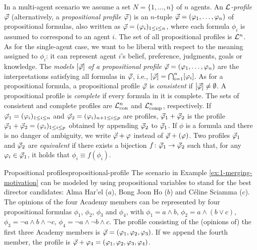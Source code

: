 In a multi-agent scenario we assume a set $N=\{1,\dots,n\}$ of $n$ agents.
An \emph{$\L$-profile $\P$} (alternatively, a \emph{propositional profile $\P$}) 
is an $n$-tuple $\P=(\phi_1,\dots,\phi_n)$ of propositional formulas,
also written as $\P=(\phi_i)_{1\le i \le n}$,
where each formula $\phi_i$ is assumed to correspond to an agent $i$.
The set of all propositional profiles is $\L^n$.
As for the single-agent case, we want to be liberal with respect 
to the meaning assigned to $\phi_i$:
it can represent agent $i$'s belief, preference, judgments, goals or knowledge.
The \emph{models $[\P]$ of a propositional profile $\P=(\phi_1,\dots,\phi_n)$} 
are the interpretations satisfying all 
formulas in $\P$, i.e., $[\P]=\bigcap_{i=1}^n[\phi_i]$.
As for a propositional formula, a propositional profile $\P$ is \emph{consistent} 
if $[\P]\neq\emptyset$.
A propositional profile is \emph{complete} 
if every formula in it is complete.
The sets of consistent and complete profiles are $\L^n_\cn$ and $\L^n_\comp$, respectively.
If $\P_1=(\phi_{i})_{1\le i \le n}$ and $\P_2=(\phi_{i})_{n+1\le i \le p}$ are profiles, 
$\append{\P_1}{\P_2}$ is the profile $\P_1+\P_2=(\phi_i)_{1\le i\le p}$ 
obtained by appending $\P_2$ to $\P_1$. 
If $\phi$ is a formula and there is no danger of ambiguity, 
we write $\append{\P}{\phi}$ instead of $\append{\P}{(\phi)}$.
Two profiles $\P_1$ and $\P_2$ are \emph{equivalent} 
if there exists a bijection $f\colon\P_1\rightarrow\P_2$ such that,
for any $\phi_i\in\P_1$, it holds that $\phi_i\equiv f(\phi_i)$.

\begin{xmpl}{Propositional profiles}{propositional-profile}
	The scenario in Example \ref{ex:1-merging-motivation} can be modeled 
	by using propositional variables to stand for the best director candidates:
	Alma Har'el ($a$),
	Bong Joon Ho ($b$)
	and 
	C\'eline Sciamma ($c$).
	The opinions of the four Academy members can be represented 
	by four propositional formulas $\phi_1$, $\phi_2$, $\phi_3$ and $\phi_4$,
	with 
	$\phi_1 = a\land b$,
	$\phi_2 = a\land (b\lor c)$,
	$\phi_3 = \lnot a\land b\land \lnot c$,
	$\phi_4 = \lnot a \land \lnot b \land c$.
	The profile consisting of the (opinions of) the first three Academy members 
	is $\P = (\phi_1,\phi_2,\phi_3)$.
	If we append the fourth member, the profile is 
	$\append{\P}{\phi_4} = (\phi_1,\phi_2,\phi_3, \phi_4)$.
\end{xmpl}


